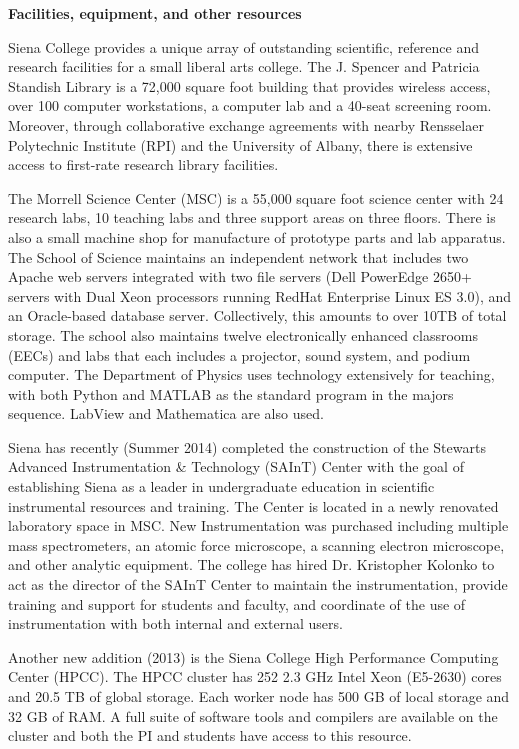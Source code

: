 \documentclass[11pt]{article}
\begin{document}
\centerline{\Large\bf Facilities, equipment, and other resources}
\vspace{0.2cm}

Siena College provides a unique array of outstanding scientific, reference and research facilities 
for a small liberal arts college.  The J. Spencer and Patricia Standish Library is a 72,000 square foot 
building that provides wireless access, over 100 computer workstations, a computer lab and a 40-seat 
screening room.  Moreover, through collaborative exchange agreements with nearby Rensselaer Polytechnic Institute (RPI) 
and the University of Albany, there is extensive access to first-rate research library facilities.

The Morrell Science Center (MSC) is a 55,000 square foot science center with 24 research labs, 10 teaching labs and 
three support areas on three floors. There is also a small machine shop for manufacture of prototype parts and 
lab apparatus.  The School of Science maintains an independent network that includes two Apache web servers integrated 
with two file servers (Dell PowerEdge 2650+ servers with Dual Xeon processors running RedHat Enterprise Linux ES 3.0), 
and an Oracle-based database server.  Collectively, this amounts to over 10TB of total storage. The school also maintains 
twelve electronically enhanced classrooms (EECs) and labs that each includes a projector, sound system, and podium computer. 
The Department of Physics uses technology extensively for teaching, with both Python and MATLAB as the standard program in the 
majors sequence.  LabView and Mathematica are also used. 

Siena has recently (Summer 2014) completed the construction of the 
Stewarts Advanced Instrumentation \& Technology (SAInT) Center with the goal of 
establishing Siena as a leader in undergraduate education in scientific 
instrumental resources and training. The Center is located in a newly renovated 
laboratory space in MSC. New Instrumentation was 
purchased including multiple mass spectrometers, 
an atomic force microscope, a scanning electron microscope, and other
analytic equipment.
The college has hired Dr. Kristopher Kolonko to act as the director of the SAInT Center to 
maintain the instrumentation, provide training and support for students and faculty, and 
coordinate of the use of instrumentation with both internal and external users.

Another new addition (2013) is the Siena College High Performance Computing Center (HPCC). 
The HPCC cluster has 252 2.3 GHz Intel Xeon (E5-2630) 
cores and 20.5 TB of global storage.  Each worker node has 500 GB of local storage and 32 GB of 
RAM. A full suite of software tools and compilers are available on the cluster and 
both the PI and students have access to this resource.
\end{document}
